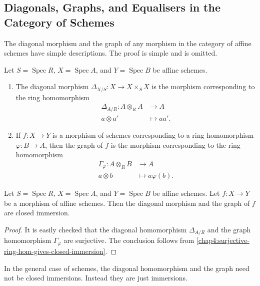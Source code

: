 \documentclass[12pt]{book}
\theoremstyle{definition}
\DeclareMathOperator{\Spec}{Spec}
\begin{document}
	\subsection*{Diagonals, Graphs, and Equalisers in the Category of Schemes}
	
	The diagonal morphism and the graph of any morphism in the category of affine schemes have simple descriptions. The proof is simple and is omitted.
	
	\begin{proposition}
		Let $S = \Spec R$, $X = \Spec A$, and $Y = \Spec B$ be affine schemes.
		\begin{enumerate}
			\item The diagonal morphism $\Delta_{X/S} \colon X \to X \times_S X$ is the morphism corresponding to the ring homomorphism
			\begin{align*}
				\Delta_{A/R} \colon A \otimes_R A & \to A \\
				a \otimes a' & \mapsto aa'.
			\end{align*}
			
			\item If $f \colon X \to Y$ is a morphism of schemes corresponding to a ring homomorphism $\varphi \colon B \to A$, then the graph of $f$ is the morphism corresponding to the ring homomorphism
			\begin{align*}
				\Gamma_{\varphi} \colon A \otimes_R B & \to A \\
				a \otimes b & \mapsto a \varphi(b). 
			\end{align*}
		\end{enumerate}
	\end{proposition}
	
	\begin{corollary}
		Let $S = \Spec R$, $X = \Spec A$, and $Y = \Spec B$ be affine schemes. Let $f \colon X \to Y$ be a morphism of affine schemes. Then the diagonal morphism and the graph of $f$ are closed immersion.
	\end{corollary}
	\begin{proof}
		It is easily checked that the diagonal homomorphism $\Delta_{A/R}$ and the graph homomorphism $\Gamma_\varphi$ are surjective. The conclusion follows from \cref{chap4:surjective-ring-hom-gives-closed-immersion}.
	\end{proof}
	
	In the general case of schemes, the diagonal homomorphism and the graph need not be closed immersions. Instead they are just immersions.
	
\end{document}
